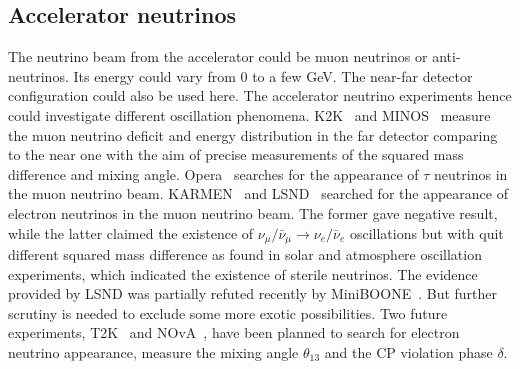 \subsection{Accelerator  neutrinos}
\label{sec:acce}
The neutrino beam from the accelerator could be muon neutrinos or anti-neutrinos. Its energy could vary from 0 to a few GeV. The near-far detector configuration could also be used here. The accelerator neutrino experiments hence could investigate different oscillation phenomena. K2K~\cite{K2K06} and MINOS~\cite{Min06} measure the muon neutrino deficit and energy distribution in the far detector comparing to the near one with the aim of precise measurements of the squared mass difference and mixing angle. Opera~\cite{Ope06} searches for the appearance of $\tau$ neutrinos in the muon neutrino beam. KARMEN~\cite{Kar03} and LSND~\cite{Dod06} searched for the appearance of electron neutrinos in the muon neutrino beam. The former gave negative result, while the latter claimed the existence of $\nu_{\mu}/\bar{\nu}_{\mu} \rightarrow \nu_{e}/\bar{\nu}_{e}$ oscillations but with quit different squared mass difference as found in solar and atmosphere oscillation experiments, which indicated the existence of sterile neutrinos. The evidence provided by LSND was partially refuted recently by MiniBOONE~\cite{Agu07}. But further scrutiny is needed to exclude some more exotic possibilities. Two future experiments, T2K~\cite{T2K05} and NOvA~\cite{Nov05}, have been planned to search for electron neutrino appearance, measure the mixing angle $\theta_{13}$ and the CP violation phase $\delta$.

